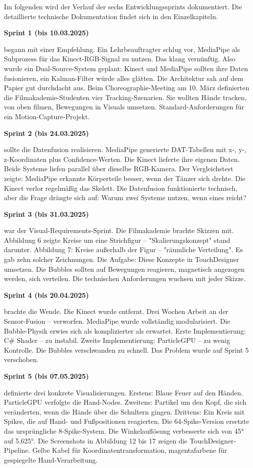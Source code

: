 Im folgenden wird der Verlauf der sechs Entwicklungssprints dokumentiert. Die detaillierte technische Dokumentation findet sich in den Einzelkapiteln.

\textbf{Sprint 1 (bis 10.03.2025)} \raggedright begann mit einer Empfehlung. Ein Lehrbeauftragter schlug vor, MediaPipe als Subprozess für das Kinect-RGB-Signal zu nutzen. Das klang vernünftig. Also wurde ein Dual-Source-System geplant: Kinect und MediaPipe sollten ihre Daten fusionieren, ein Kalman-Filter würde alles glätten. Die Architektur sah auf dem Papier gut durchdacht aus. Beim Choreographie-Meeting am 10. März definierten die Filmakademie-Studenten vier Tracking-Szenarien. Sie wollten Hände tracken, von oben filmen, Bewegungen in Visuals umsetzen. Standard-Anforderungen für ein Motion-Capture-Projekt.

\textbf{Sprint 2 (bis 24.03.2025) }\raggedright sollte die Datenfusion realisieren. MediaPipe generierte DAT-Tabellen mit x-, y-, z-Koordinaten plus Confidence-Werten. Die Kinect lieferte ihre eigenen Daten. Beide Systeme liefen parallel über dieselbe RGB-Kamera. Der Vergleichstest zeigte: MediaPipe erkannte Körperteile besser, wenn der Tänzer sich drehte. Die Kinect verlor regelmäßig das Skelett. Die Datenfusion funktionierte technisch, aber die Frage drängte sich auf: Warum zwei Systeme nutzen, wenn eines reicht?

\textbf{Sprint 3 (bis 31.03.2025)} \raggedright war der Visual-Requirements-Sprint. Die Filmakademie brachte Skizzen mit. Abbildung 6 zeigte Kreise um eine Strichfigur – "Skalierungskonzept" stand darunter. Abbildung 7: Kreise außerhalb der Figur – "räumliche Verteilung". Es gab zehn solcher Zeichnungen. Die Aufgabe: Diese Konzepte in TouchDesigner umsetzen. Die Bubbles sollten auf Bewegungen reagieren, magnetisch angezogen werden, sich verteilen. Die technischen Anforderungen wuchsen mit jeder Skizze.

\textbf{Sprint 4 (bis 20.04.2025) }\raggedright brachte die Wende. Die Kinect wurde entfernt. Drei Wochen Arbeit an der Sensor-Fusion – verworfen. MediaPipe wurde vollständig modularisiert. Die Bubble-Physik erwies sich als komplizierter als erwartet. Erste Implementierung: C\# Shader – zu instabil. Zweite Implementierung: ParticleGPU – zu wenig Kontrolle. Die Bubbles verschwanden zu schnell. Das Problem wurde auf Sprint 5 verschoben.

\textbf{Sprint 5 (bis 07.05.2025)} \raggedright definierte drei konkrete Visualisierungen. Erstens: Blaue Feuer auf den Händen. ParticleGPU verfolgte die Hand-Nodes. Zweitens: Partikel um den Kopf, die sich veränderten, wenn die Hände über die Schultern gingen. Drittens: Ein Kreis mit Spikes, die auf Hand- und Fußpositionen reagierten. Die 64-Spike-Version ersetzte das ursprüngliche 8-Spike-System. Die Winkelauflösung verbesserte sich von 45° auf 5,625°. Die Screenshots in Abbildung 12 bis 17 zeigen die TouchDesigner-Pipeline. Gelbe Kabel für Koordinatentransformation, magentafarbene für gespiegelte Hand-Verarbeitung.

